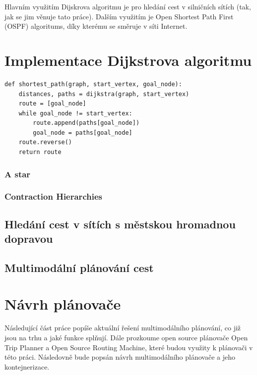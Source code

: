 \documentclass[thesis=M,czech]{FITthesis}[2019/12/23]
\theoremstyle{plain}
\theoremstyle{definition}
\begin{document}
Hlavním využitím Dijskrova algoritmu je pro hledání cest v silničních sítích (tak, jak se jim věnuje tato práce). Dalším využitím je Open Shortest Path First (OSPF) algoritums, díky kterému se směruje v síti Internet.




\section{Implementace Dijkstrova algoritmu}




\begin{verbatim}
def shortest_path(graph, start_vertex, goal_node):
    distances, paths = dijkstra(graph, start_vertex)
    route = [goal_node]
    while goal_node != start_vertex:
        route.append(paths[goal_node])
        goal_node = paths[goal_node]
    route.reverse()
    return route
\end{verbatim}



\subsubsection{A star}
\subsubsection{Contraction Hierarchies}


\subsection{Hledání cest v sítích s městskou hromadnou dopravou}

\subsection{Multimodální plánování cest}






\section{Návrh plánovače}

Následující část práce popíše aktuální řešení multimodálního plánování, co již jsou na trhu a jaké funkce splňují. Dále prozkoume open source plánovače Open Trip Planner a Open Source Routing Machine, které budou využity k plánovači v této práci. Následovně bude popsán návrh multimodálního plánovače a jeho kontejnerizace.
\end{document}
